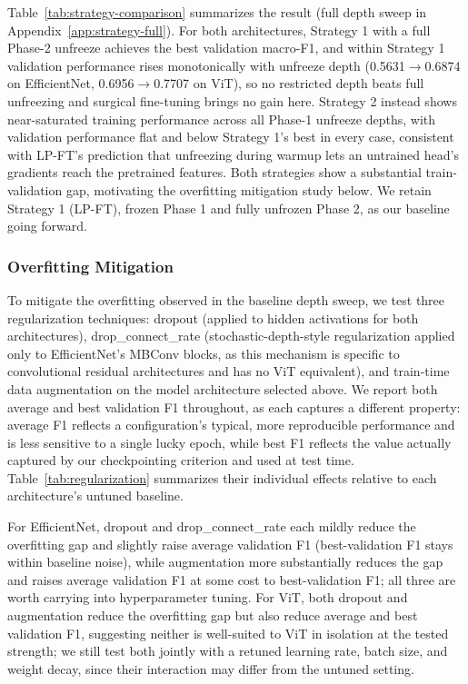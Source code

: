 \documentclass[10pt,twocolumn,letterpaper]{article}
\begin{document}
Table~\ref{tab:strategy-comparison} summarizes the result (full depth sweep in
Appendix~\ref{app:strategy-full}). For both architectures, Strategy 1 with a
full Phase-2 unfreeze achieves the best validation macro-F1, and within
Strategy 1 validation performance rises monotonically with unfreeze depth
(0.5631$\to$0.6874 on EfficientNet, 0.6956$\to$0.7707 on ViT), so no
restricted depth beats full unfreezing and surgical fine-tuning brings no gain
here. Strategy 2 instead shows near-saturated training performance across all
Phase-1 unfreeze depths, with validation performance flat and below Strategy
1's best in every case, consistent with LP-FT's prediction that unfreezing
during warmup lets an untrained head's gradients reach the pretrained
features. Both strategies show a substantial train-validation gap, motivating
the overfitting mitigation study below. We retain Strategy 1 (LP-FT), frozen
Phase 1 and fully unfrozen Phase 2, as our baseline going forward.

\subsubsection{Overfitting Mitigation}
\label{sec:effnet-overfit}
To mitigate the overfitting observed in the baseline depth sweep, we test three regularization techniques: dropout (applied to hidden activations for both architectures), drop\_connect\_rate (stochastic-depth-style regularization applied only to EfficientNet's MBConv blocks, as this mechanism is specific to convolutional residual architectures and has no ViT equivalent), and train-time data augmentation on the model architecture selected above. We report both average and best validation F1 throughout, as each captures a different property: average F1 reflects a configuration's typical, more reproducible performance and is less sensitive to a single lucky epoch, while best F1 reflects the value actually captured by our checkpointing criterion and used at test time. Table~\ref{tab:regularization} summarizes their individual effects relative to each architecture's untuned baseline.

For EfficientNet, dropout and drop\_connect\_rate each mildly reduce the overfitting gap and slightly raise average validation F1 (best-validation F1 stays within baseline noise), while augmentation more substantially reduces the gap and raises average validation F1 at some cost to best-validation F1; all three are worth carrying into hyperparameter tuning. For ViT, both dropout and augmentation reduce the overfitting gap but also reduce average and best validation F1, suggesting neither is well-suited to ViT in isolation at the tested strength; we still test both jointly with a retuned learning rate, batch size, and weight decay, since their interaction may differ from the untuned setting.
\end{document}
